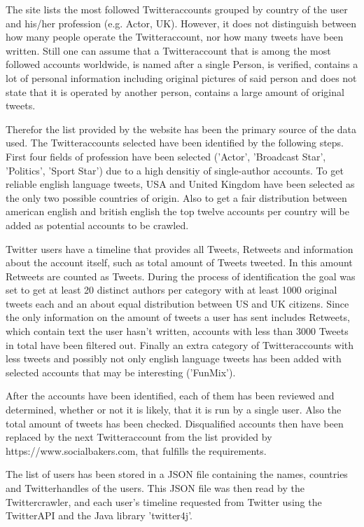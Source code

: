 \documentclass[journal, a4paper, 12pt]{IEEEtran}
\begin{document}
The site lists the most followed Twitteraccounts grouped by country of the user and his/her profession (e.g. Actor, UK). However, it does not distinguish between how many people operate the Twitteraccount, nor how many tweets have been written. Still one can assume that a Twitteraccount that is among the most followed accounts worldwide, is named after a single Person, is verified, contains a lot of personal information including original pictures of said person and does not state that it is operated by another person, contains a large amount of original tweets. 

Therefor the list provided by the website has been the primary source of the data used. The Twitteraccounts selected have been identified by the following steps. First four fields of profession have been selected ('Actor', 'Broadcast Star', 'Politics', 'Sport Star') due to a high densitiy of single-author accounts. To get reliable english language tweets, USA and United Kingdom have been selected as the only two possible countries of origin. Also to get a fair distribution between american english and british english the top twelve accounts per country will be added as potential accounts to be crawled. 

Twitter users have a timeline that provides all Tweets, Retweets and information about the account itself, such as total amount of Tweets tweeted. In this amount Retweets are counted as Tweets. During the process of identification the goal was set to get at least 20 distinct authors per category with at least 1000 original tweets each and an about equal distribution between US and UK citizens. Since the only information on the amount of tweets a user has sent includes Retweets, which contain text the user hasn't written, accounts with less than 3000 Tweets in total have been filtered out. Finally an extra category of Twitteraccounts with less tweets and possibly not only english language tweets has been added with selected accounts that may be interesting ('FunMix'). 

After the accounts have been identified, each of them has been reviewed and determined, whether or not it is likely, that it is run by a single user. Also the total amount of tweets has been checked. Disqualified accounts then have been replaced by the next Twitteraccount from the list provided by https://www.socialbakers.com, that fulfills the requirements.

The list of users has been stored in a JSON file containing the names, countries and Twitterhandles of the users. This JSON file was then read by the Twittercrawler, and each user's timeline requested from Twitter using the TwitterAPI and the Java library 'twitter4j'. 
\end{document}
